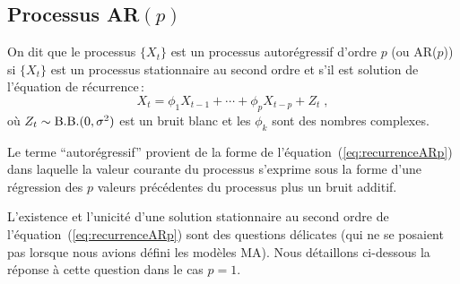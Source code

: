 \subsection{Processus AR$(p)$}
\begin{definition}[Processus AR($p$)]
On dit que le processus $\{ X_t \}$ est un processus autor\'egressif d'ordre $p$ (ou AR($p$)) si
$\{X_t \}$ est un processus stationnaire au second ordre et s'il est solution de l'\'equation de r\'ecurrence\,:
\begin{equation}
 \label{eq:recurrenceARp}
 X_t = \phi_1 X_{t-1} + \cdots + \phi_p X_{t-p} + Z_t\; ,
\end{equation}
o\`u $Z_t \sim \mathrm{B.B.}(0,\sigma^2)$ est un bruit blanc et les $\phi_k$ sont des nombres
complexes.
\end{definition}
Le terme ``autor\'egressif'' provient de la forme de l'\'equation~(\ref{eq:recurrenceARp}) dans
laquelle la valeur courante du processus s'exprime sous la forme
d'une r\'egression des
$p$ valeurs pr\'ec\'edentes du processus plus un bruit additif.

L'existence et l'unicit\'e d'une solution stationnaire au second ordre de
l'\'equation~(\ref{eq:recurrenceARp}) sont des questions d\'elicates (qui ne se posaient pas
lorsque nous avions d\'efini les mod\`eles MA). Nous d\'etaillons ci-dessous la r\'eponse \`a cette question
dans le cas $p=1$.

